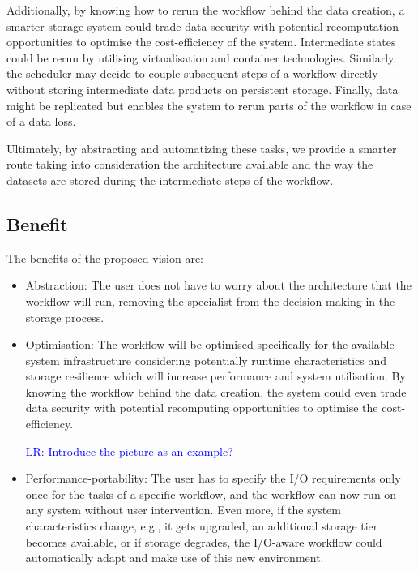 \documentclass{superfri}
\newcommand{\lr}[1]{\textcolor{blue}{LR: #1}}
\begin{document}
Additionally, by knowing how to rerun the workflow behind the data creation, a smarter storage system could trade data security with potential recomputation opportunities to optimise the cost-efficiency of the system.
Intermediate states could be rerun by utilising virtualisation and container technologies.
Similarly, the scheduler may decide to couple subsequent steps of a workflow directly without storing intermediate data products on persistent storage.
Finally, data might be replicated but enables the system to rerun parts of the workflow in case of a data loss.

Ultimately, by abstracting and automatizing these tasks, we provide a smarter route taking into consideration the architecture available and the way the datasets are stored during the intermediate steps of the workflow.


\subsection{Benefit}

The benefits of the proposed vision are:

\begin{itemize}

\item Abstraction: The user does not have to worry about the architecture that the workflow will run, removing the specialist from the decision-making in the storage process.

\item Optimisation: The workflow will be optimised specifically for the available system infrastructure considering potentially runtime characteristics and storage resilience which will increase performance and system utilisation.
By knowing the workflow behind the data creation, the system could even trade data security with potential recomputing opportunities to optimise the cost-efficiency.

\lr{Introduce the picture as an example?}

\item Performance-portability: The user has to specify the I/O requirements only once for the tasks of a specific workflow, and the workflow can now run on any system without user intervention.
Even more, if the system characteristics change, e.g., it gets upgraded, an additional storage tier becomes available, or if storage degrades, the I/O-aware workflow could automatically adapt and make use of this new environment.

\end{itemize}
\end{document}
